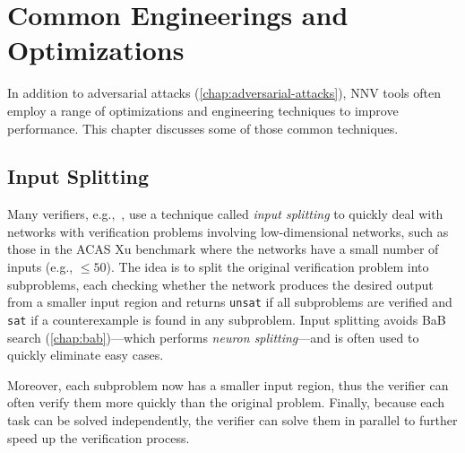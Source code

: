 \documentclass[oneside,11pt,dvipsnames]{book}
\numberwithin{equation}{section}
\theoremstyle{definition}
\theoremstyle{remark}
\newcommand{\prooflang}{\texttt{BaB$_{\text{ProofLang}}$}}
\newcommand{\proofcheck}{\texttt{BaB$_{\text{ProofCheck}}$}}
\newcommand{\sat}{\texttt{sat}}
\newcommand{\unsat}{\texttt{unsat}}
\begin{document}




\chapter{Common Engineerings and Optimizations}\label{chap:common-engineering}

In addition to adversarial attacks (\autoref{chap:adversarial-attacks}), NNV tools often employ a range of optimizations and engineering techniques to improve performance. This chapter discusses some of those common techniques.

\section{Input Splitting}\label{sec:input-splitting}

Many verifiers, e.g.,~\cite{katz2019marabou,wang2018formal,wang2021beta,duong2025neuralsat}, use a technique called \emph{input splitting} to quickly deal with networks with verification problems involving low-dimensional networks, such as those in the ACAS Xu benchmark where the networks have a small number of inputs (e.g., $\le 50$).
The idea is to split the original verification problem into subproblems, each checking whether the network produces the desired output from a smaller input region and returns \unsat{} if all subproblems are verified and \sat{} if a counterexample is found in any subproblem. Input splitting avoids BaB search (\autoref{chap:bab})---which performs \emph{neuron splitting}---and is often used to quickly eliminate easy cases.

Moreover, each subproblem now has a smaller input region, thus the verifier can often verify them more quickly than the original problem.
Finally, because each task can be solved independently, the verifier can solve them in parallel to further speed up the verification process.
\end{document}
